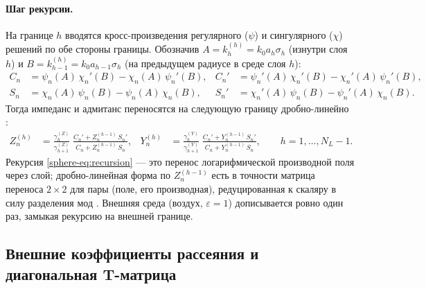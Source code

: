 \documentclass[11pt,a4paper]{article}
\begin{document}
\paragraph{Шаг рекурсии.} На границе $h$ вводятся кросс-произведения регулярного ($\psi$) и сингулярного ($\chi$) решений по обе стороны границы. Обозначив $A=k_h^{(h)}=k_0 a_h\sigma_h$ (изнутри слоя $h$) и $B=k_{h-1}^{(h)}=k_0 a_{h-1}\sigma_h$ (на предыдущем радиусе в среде слоя $h$):
\begin{align}
C_n &= \psi_n(A)\,\chi_n'(B)-\chi_n(A)\,\psi_n'(B), &
C_n' &= \psi_n'(A)\,\chi_n'(B)-\chi_n'(A)\,\psi_n'(B),\\
S_n &= \chi_n(A)\,\psi_n(B)-\psi_n(A)\,\chi_n(B), &
S_n' &= \chi_n'(A)\,\psi_n(B)-\psi_n'(A)\,\chi_n(B).
\label{sphere-eq:CS}
\end{align}
Тогда импеданс и адмитанс переносятся на следующую границу дробно-линейно \cite{aden1951,bohren1983}:
\begin{align}
Z_n^{(h)} &= \frac{\gamma_h^{(Z)}}{\gamma_{h+1}^{(Z)}}\;
\frac{C_n'+Z_n^{(h-1)}\,S_n'}{C_n+Z_n^{(h-1)}\,S_n},
&
Y_n^{(h)} &= \frac{\gamma_h^{(Y)}}{\gamma_{h+1}^{(Y)}}\;
\frac{C_n'+Y_n^{(h-1)}\,S_n'}{C_n+Y_n^{(h-1)}\,S_n},
\qquad h=1,\dots,N_L-1.
\label{sphere-eq:recursion}
\end{align}
Рекурсия \eqref{sphere-eq:recursion} --- это перенос логарифмической производной поля через слой; дробно-линейная форма по $Z_n^{(h-1)}$ есть в точности матрица переноса $2\times2$ для пары (поле, его производная), редуцированная к скаляру в силу разделения мод \cite{aden1951,mishchenko2002}. Внешняя среда (воздух, $\varepsilon=1$) дописывается ровно один раз, замыкая рекурсию на внешней границе.

\subsection{Внешние коэффициенты рассеяния и диагональная T-матрица}
\end{document}
